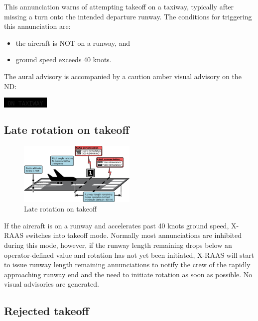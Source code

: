 \documentclass[a4paper,12pt]{article}
\newcommand{\visualadvisory}[3][b]{%
    \ifthenelse{\equal{#1}{b}}{\begin{center}}{}
    \noindent
    \colorbox{black}{\textcolor{#2visualadvisorycolor}{\large\texttt{~#3~}}}
    \ifthenelse{\equal{#1}{b}}{\end{center}}{}}
\begin{document}
This annunciation warns of attempting takeoff on a taxiway, typically
after missing a turn onto the intended departure runway. The conditions
for triggering this annunciation are:

\begin{itemize}

\item the aircraft is NOT on a runway, and

\item ground speed exceeds 40 knots.

\end{itemize}

\noindent The aural advisory is accompanied by a caution amber visual
advisory on the ND:

\visualadvisory{nonroutine}{ON TAXIWAY}

\newpage
\subsection{Late rotation on takeoff}
\label{subsec:LateRotationMon}

\begin{figure}
\begin{center}
\includegraphics[width=0.5\textwidth]{../src/takeoff_roll.pdf}
\end{center}
\caption{Late rotation on takeoff}
\end{figure}

If the aircraft is on a runway and accelerates past 40 knots ground
speed, X-RAAS switches into takeoff mode. Normally most annunciations are
inhibited during this mode, however, if the runway length remaining drops
below an operator-defined value and rotation has not yet been initiated,
X-RAAS will start to issue runway length remaining annunciations to
notify the crew of the rapidly approaching runway end and the need to
initiate rotation as soon as possible. No visual advisories are
generated.

\subsection{Rejected takeoff}
\label{subsec:RejectedTakeoffMon}
\end{document}
